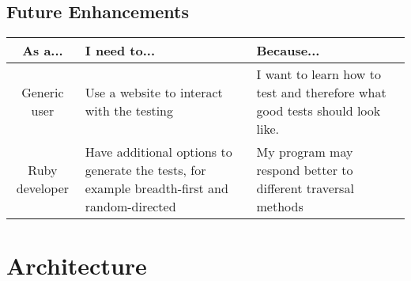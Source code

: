   \subsection{Future Enhancements}
    \begin{tabular}{| c | p{5cm} | p{5cm} |}
    \hline
    \textbf{As a...} & \textbf{I need to...} & \textbf{Because...} \\
    \hline
    Generic user & Use a website to interact with the testing & I want to learn how to test and therefore what good tests should look like. \\
    \hline
    Ruby developer & Have additional options to generate the tests, for example breadth-first and random-directed & My program may respond better to different traversal methods \\
    \hline
    \end{tabular}
  \section{Architecture}
